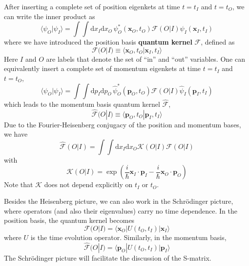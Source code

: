 After inserting a complete set of position eigenkets at time $t = t_{I}$ and $t = t_{O}$, we can write the inner product as
\begin{equation}
	\langle \psi_{O} | \psi_{I} \rangle = \int \int \mathrm{d}x_{I} \mathrm{d}x_{O} \, \psi_{O}^{*}(\mathbf{x}_{O}, t_{O}) \mathcal{F}(O|I) \psi_{I}(\mathbf{x}_{I}, t_{I})
\end{equation}
where we have introduced the position basis \textbf{quantum kernel} $\mathcal{F}$, defined as
\begin{equation}
	\mathcal{F}(O|I) \equiv \langle \mathbf{x}_{O} , t_{O} | \mathbf{x}_{I}, t_{I} \rangle
\end{equation}
Here $I$ and $O$ are labels that denote the set of ``in'' and ``out'' variables. One can equivalently insert a complete set of momentum eigenkets at time $t = t_{I}$ and $t = t_{O}$,
\begin{equation}
	\langle \psi_{O} | \psi_{I} \rangle = \int \int \mathrm{d}p_{I} \mathrm{d}p_{O} \, \hat{\psi}_{O}^{*}(\mathbf{p}_{O}, t_{O}) \widehat{\mathcal{F}}(O|I) \hat{\psi}_{I}(\mathbf{p}_{I}, t_{I})
\end{equation}
which leads to the momentum basis quantum kernel $\widehat{\mathcal{F}}$,
\begin{equation}
	\widehat{\mathcal{F}}(O|I) \equiv \langle \mathbf{p}_{O} , t_{O} | \mathbf{p}_{I}, t_{I} \rangle
\end{equation}
Due to the Fourier-Heisenberg conjugacy of the position and momentum bases, we have
\begin{equation}
	\widehat{\mathcal{F}}(O|I) = \int \int \mathrm{d} x_{I} \mathrm{d} x_{O}\mathcal{K}(O|I) \mathcal{F}(O|I) \label{FeynHatAsInt}
\end{equation}
with
\begin{equation}
	\mathcal{K}(O|I) = \exp{\left( \frac{i}{\hbar} \mathbf{x}_{I} \cdot \mathbf{p}_{I} -\frac{i}{\hbar} \mathbf{x}_{O} \cdot \mathbf{p}_{O} \right)}
\end{equation}
Note that $\mathcal{K}$ does not depend explicitly on $t_{I}$ or $t_{O}$.

Besides the Heisenberg picture, we can also work in the Schr\"{o}dinger picture, where operators (and also their eigenvalues) carry no time dependence. In the position basis, the quantum kernel becomes
\begin{equation}
	\mathcal{F}(O|I) = \langle \mathbf{x}_{O} | U(t_{O}, t_{I}) | \mathbf{x}_{I} \rangle
\end{equation}
where $U$ is the time evolution operator. Similarly, in the momentum basis,
\begin{equation}
	\widehat{\mathcal{F}}(O|I) = \langle \mathbf{p}_{O} | U(t_{O}, t_{I}) | \mathbf{p}_{I} \rangle
\end{equation}
The Schr\"{o}dinger picture will facilitate the discussion of the S-matrix.
